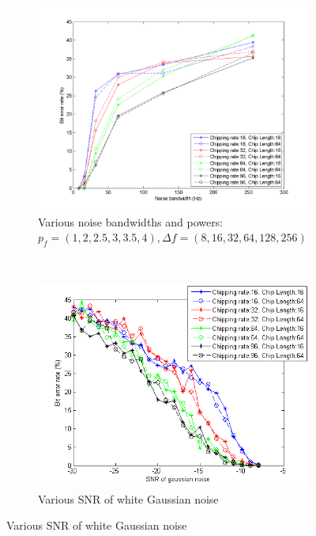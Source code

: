 			\begin{figure}[H]
				\centering
				\begin{subfigure}[b]{0.5\textwidth}
					\includegraphics[width=\textwidth]{imgs/results/plot_mode_dsss-test_bandwidthAndPower-rep_20-dataRate_8-dataLength_128.png}
					\caption{Various noise bandwidths and powers: $p_f = (1,2,2.5,3,3.5,4), \Delta f = (8,16,32,64,128,256)$}
					\label{fig:dsss_bandwidth}
				\end{subfigure}%
				~
				\begin{subfigure}[b]{0.5\textwidth}
					\includegraphics[width=\textwidth]{imgs/results/plot_mode_dsss-test_gaussianSNR-rep_20-dataRate_8-dataLength_128_fixedlegend.png}
					\caption{Various SNR of white Gaussian noise}
					\label{fig:dsss_gaussian}
				\end{subfigure}
			\end{figure}		
				
